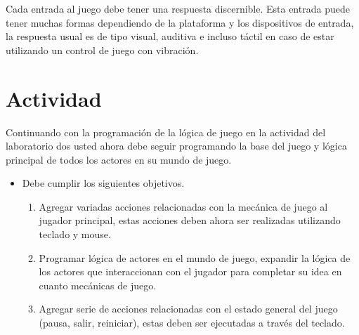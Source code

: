 Cada entrada al juego debe tener una respuesta discernible. Esta entrada puede tener muchas formas dependiendo de la plataforma y los dispositivos de entrada, la respuesta usual es de tipo visual, auditiva e incluso táctil en caso de estar utilizando un control de juego con vibración.

\section{Actividad}
Continuando con la programación de la lógica de juego en la actividad del laboratorio dos usted ahora debe seguir programando la base del juego y lógica principal de todos los actores en su mundo de juego.
\begin{itemize}
\item Debe cumplir los siguientes objetivos.
\begin{enumerate}
  \item Agregar variadas acciones relacionadas con la mecánica de juego al jugador principal, estas acciones deben ahora ser realizadas utilizando teclado y mouse.
  \item Programar lógica de actores en el mundo de juego, expandir la lógica de los actores que interaccionan con el jugador para completar su idea en cuanto mecánicas de juego.
  \item Agregar serie de acciones relacionadas con el estado general del juego (pausa, salir, reiniciar), estas deben ser ejecutadas a través del teclado.
\end{enumerate}
\end{itemize}